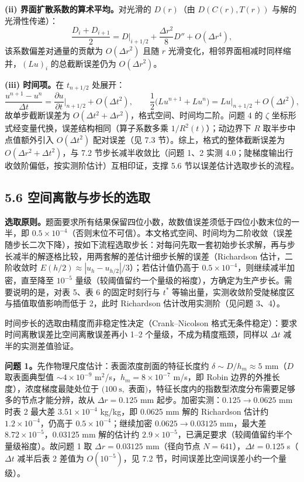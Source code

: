 \documentclass[12pt,a4paper]{ctexart}
\newcommand{\pdd}[2]{\dfrac{\partial #1}{\partial #2}}
\begin{document}
\textbf{(ii) 界面扩散系数的算术平均。}对光滑的 $D(r)$（由 $D(C(r),T(r))$ 与解的光滑性传递）：
\begin{equation}
\frac{D_i+D_{i+1}}{2}=D\Big|_{i+1/2}+\frac{\Delta r^2}{8}D''+O(\Delta r^4),
\end{equation}
该系数偏差对通量的贡献为 $O(\Delta r^2)$ 且随 $r$ 光滑变化，相邻界面相减时同样缩并，$(Lu)_i$ 的总截断误差仍为 $O(\Delta r^2)$。

\textbf{(iii) 时间项。}在 $t_{n+1/2}$ 处展开：
\begin{equation}
\frac{u^{n+1}-u^n}{\Delta t}=\pdd{u}{t}\Big|_{n+1/2}+O(\Delta t^2),\qquad
\frac12\bigl(Lu^{n+1}+Lu^n\bigr)=Lu\Big|_{n+1/2}+O(\Delta t^2),
\end{equation}
故单步截断误差为 $O(\Delta t^2+\Delta r^2)$，格式空间、时间均二阶。问题 4 的 $\zeta$ 坐标形式经变量代换，误差结构相同（算子系数多乘 $1/R^2(t)$）；动边界下 $R$ 取半步中点值额外引入 $O(\Delta t^2)$ 配对误差（见 7.3 节）。综上，格式的整体截断误差为 $O(\Delta r^2+\Delta t^2)$，与 7.2 节步长减半收敛比（问题 1、2 实测 4.0；陡梯度输出行收敛阶偏低，按实测阶估计）互相印证，支撑 5.6 节以误差估计选取步长的流程。

\subsection{5.6 空间离散与步长的选取}

\textbf{选取原则。}题面要求所有结果保留四位小数，故数值误差须低于四位小数末位的一半，即 $0.5\times10^{-4}$（否则末位不可信）。本文格式空间、时间均为二阶收敛（误差随步长二次下降），按如下流程选取步长：对每问先取一套初始步长求解，再与步长减半的解逐格比较，用两套解的差估计细步长解的误差（Richardson 估计，二阶收敛时 $E(h/2)\approx|u_h-u_{h/2}|/3$）；若估计值仍高于 $0.5\times10^{-4}$，则继续减半加密，直至降至 $10^{-5}$ 量级（较阈值留约一个量级的裕度），方确定为生产步长。需要说明的是，对表 5、表 6 的固定时刻行与 $t^*$ 等输出量，实测收敛阶受陡梯度区与插值取值影响而低于 2，此时 Richardson 估计改用实测阶（见问题 3、4）。

时间步长的选取由精度而非稳定性决定（Crank--Nicolson 格式无条件稳定）：要求时间离散误差比空间离散误差再小 1--2 个量级，不成为精度瓶颈，同样以 $\Delta t$ 减半的实测差值验证。

\textbf{问题 1。}先作物理尺度估计：表面浓度剖面的特征长度约 $\delta\sim D/h_m\approx5$ mm（$D$ 取表面典型值 $\sim4\times10^{-9}$ m$^2$/s，$h_m=8\times10^{-7}$ m/s，即 Robin 边界的外推长度），浓度梯度最陡处位于 $(100\ \mathrm{s},$ 表面$)$，特征长度内的指数型浓度分布需要足够多的节点才能分辨，故从 $\Delta r=0.125$ mm 起步。加密实测：$0.125\to0.0625$ mm 时表 2 最大差 $3.51\times10^{-4}$ kg/kg，即 0.0625 mm 解的 Richardson 估计约 $1.2\times10^{-4}$，仍高于 $0.5\times10^{-4}$；继续加密 $0.0625\to0.03125$ mm，最大差 $8.72\times10^{-5}$，0.03125 mm 解的估计约 $2.9\times10^{-5}$，已满足要求（较阈值留约半个量级裕度）。故问题 1 取 $\Delta r=0.03125$ mm（径向节点 $N=641$），$\Delta t=0.125$ s（$\Delta t$ 减半后表 2 差值为 $O(10^{-5})$，见 7.2 节，时间误差比空间误差小约一个量级）。
\end{document}
